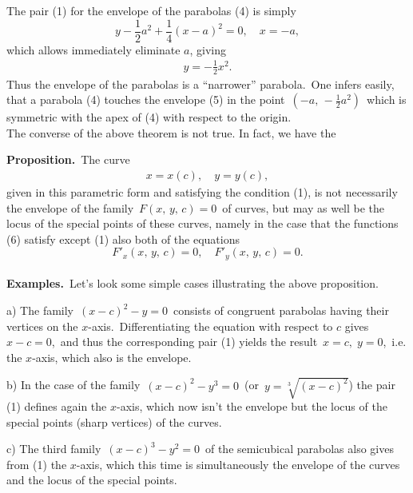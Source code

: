\documentclass[12pt]{article}
\theoremstyle{definition}
\begin{document}
The pair (1) for the envelope of the parabolas (4) is simply
$$y-\frac{1}{2}a^2+\frac{1}{4}(x-a)^2 = 0,\quad x = -a,$$
which allows immediately eliminate $a$, giving
\begin{align}
y = -\frac{1}{2}x^2.
\end{align}
Thus the envelope of the parabolas is a ``narrower'' parabola.\, One infers easily, that a parabola (4) touches the envelope (5) in the point\, $(-a,\,-\frac{1}{2}a^2)$\, which is symmetric with the apex of (4) with respect to the origin.\\

The converse of the above theorem is not true.  In fact, we have the 

\textbf{Proposition.}\, The curve
\begin{align}
x = x(c),\quad y = y(c),
\end{align}
given in this parametric form and satisfying the condition (1), is not necessarily the envelope of the family\, $F(x,\,y,\,c) = 0$\, of curves, but may as well be the locus of the special points of these curves, namely in the case that the functions (6) satisfy except (1) also both of the equations
$$F'_x(x,\,y,\,c) = 0,\quad F'_y(x,\,y,\,c) = 0.$$\\

\textbf{Examples.}\, Let's look some simple cases illustrating the above proposition.

a) The family\, $(x-c)^2-y = 0$\, consists of congruent parabolas having their vertices on the $x$-axis.\, Differentiating the equation with respect to $c$ gives\, $x-c = 0$,\, and thus the corresponding pair (1) yields the result\, $x = c,\; y = 0$,\, i.e. the $x$-axis, which also is the envelope.

b) In the case of the family\, $(x-c)^2-y^3 = 0$\, (or\, $y = \sqrt[3]{(x-c)^2}$) the pair (1) defines again the $x$-axis, which now isn't the envelope but the locus of the special points (sharp vertices) of the curves.

c) The third family\, $(x-c)^3-y^2 = 0$\, of the semicubical parabolas also gives from (1) the $x$-axis, which this time is simultaneously the envelope of the curves and the locus of the special points.
\end{document}
